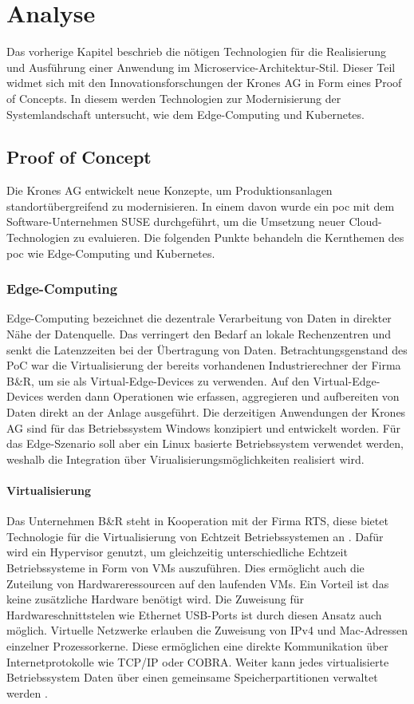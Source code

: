 \chapter{Analyse}

Das vorherige Kapitel beschrieb die nötigen Technologien für die Realisierung und Ausführung einer Anwendung im Microservice-Architektur-Stil.
Dieser Teil widmet sich mit den Innovationsforschungen der Krones AG in Form eines Proof of Concepts.
In diesem werden Technologien zur Modernisierung der Systemlandschaft untersucht, wie dem Edge-Computing und Kubernetes.


\section{Proof of Concept}\label{moderninfra}
Die Krones AG entwickelt neue Konzepte, um Produktionsanlagen standortübergreifend zu modernisieren. 
In einem davon wurde ein \ac{poc} mit dem Software-Unternehmen SUSE durchgeführt, um die Umsetzung neuer Cloud-Technologien zu evaluieren. 
Die folgenden Punkte behandeln die Kernthemen des \acs{poc} wie Edge-Computing und Kubernetes.

\subsection{Edge-Computing}
Edge-Computing bezeichnet die dezentrale Verarbeitung von Daten in direkter Nähe der Datenquelle. 
Das verringert den Bedarf an lokale Rechenzentren und senkt die Latenzzeiten bei der Übertragung von Daten. 
Betrachtungsgenstand des PoC war die Virtualisierung der bereits vorhandenen Industrierechner der Firma B\&R, um sie als Virtual-Edge-Devices zu verwenden.
Auf den Virtual-Edge-Devices werden dann Operationen wie erfassen, aggregieren und aufbereiten von Daten direkt an der Anlage ausgeführt. 
Die derzeitigen Anwendungen der Krones AG sind für das Betriebssystem Windows konzipiert und entwickelt worden.
Für das Edge-Szenario soll aber ein Linux basierte Betriebssystem verwendet werden,
weshalb die Integration über Virualisierungsmöglichkeiten realisiert wird.

\subsubsection{Virtualisierung}
Das Unternehmen B\&R steht in Kooperation mit der Firma RTS, diese bietet Technologie für die Virtualisierung von Echtzeit Betriebssystemen an \cite{rtosandbundr}.
Dafür wird ein Hypervisor genutzt, um gleichzeitig unterschiedliche Echtzeit Betriebssysteme in Form von VMs auszuführen.
Dies ermöglicht auch die Zuteilung von Hardwareressourcen auf den laufenden VMs.
Ein Vorteil ist das keine zusätzliche Hardware benötigt wird.
Die Zuweisung für Hardwareschnittstelen wie Ethernet USB-Ports ist durch diesen Ansatz auch möglich.
Virtuelle Netzwerke erlauben die Zuweisung von IPv4 und Mac-Adressen einzelner Prozessorkerne.
Diese ermöglichen eine direkte Kommunikation über Internetprotokolle wie TCP/IP oder COBRA.
Weiter kann jedes virtualisierte Betriebssystem Daten über einen gemeinsame Speicherpartitionen verwaltet werden \cite{rtos}.

